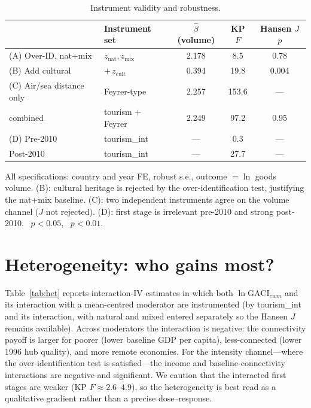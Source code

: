 \documentclass[review,3p,times]{elsarticle}
\newcommand{\sym}[1]{\rlap{$^{#1}$}}
\begin{document}
\begin{table}[t]
\centering
\caption{Instrument validity and robustness.}
\label{tab:robust}
\begin{threeparttable}
\small
\begin{tabular}{llccc}
\toprule
 & Instrument set & $\hat\beta$ (volume) & KP $F$ & Hansen $J$ $p$ \\
\midrule
(A) Over-ID, nat+mix      & $z_{\text{nat}},z_{\text{mix}}$ & 2.178\sym{***} & 8.5 & 0.78 \\
(B) Add cultural          & $+\,z_{\text{cult}}$            & 0.394          & 19.8 & 0.004 \\
(C) Air/sea distance only & Feyrer-type                     & 2.257\sym{***} & 153.6 & --- \\
\quad combined            & tourism $+$ Feyrer              & 2.249\sym{***} & 97.2 & 0.95 \\
(D) Pre-2010              & tourism\_int                    & ---            & 0.3 & --- \\
\quad Post-2010           & tourism\_int                    & ---            & 27.7 & --- \\
\bottomrule
\end{tabular}
\begin{tablenotes}\footnotesize
\item All specifications: country and year FE, robust s.e., outcome $=\ln$ goods
volume. (B): cultural heritage is rejected by the over-identification test,
justifying the nat+mix baseline. (C): two independent instruments agree on the
volume channel ($J$ not rejected). (D): first stage is irrelevant pre-2010 and
strong post-2010. \sym{**}~$p<0.05$, \sym{***}~$p<0.01$.
\end{tablenotes}
\end{threeparttable}
\end{table}

\section{Heterogeneity: who gains most?}
Table~\ref{tab:het} reports interaction-IV estimates in which both
$\ln\text{GACI}_{cwm}$ and its interaction with a mean-centred moderator are
instrumented (by tourism\_int and its interaction, with natural and mixed
entered separately so the Hansen $J$ remains available). Across moderators the
interaction is negative: the connectivity payoff is larger for poorer
(lower baseline GDP per capita), less-connected (lower 1996 hub quality), and
more remote economies. For the intensity channel---where the over-identification
test is satisfied---the income and baseline-connectivity interactions are
negative and significant. We caution that the interacted first stages are
weaker (KP $F\approx2.6$--$4.9$), so the heterogeneity is best read as a
qualitative gradient rather than a precise dose--response.
\end{document}
